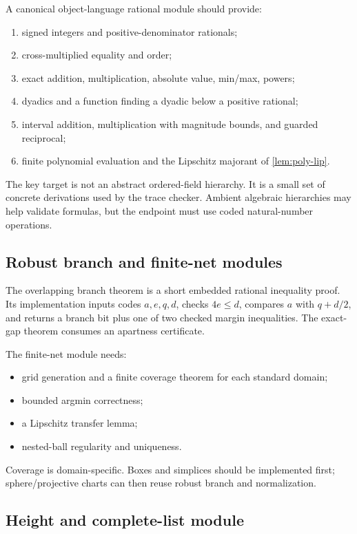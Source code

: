 A canonical object-language rational module should provide:

\begin{enumerate}
\item signed integers and positive-denominator rationals;
\item cross-multiplied equality and order;
\item exact addition, multiplication, absolute value, min/max, powers;
\item dyadics and a function finding a dyadic below a positive rational;
\item interval addition, multiplication with magnitude bounds, and guarded
      reciprocal;
\item finite polynomial evaluation and the Lipschitz majorant of
      \cref{lem:poly-lip}.
\end{enumerate}

The key target is not an abstract ordered-field hierarchy.  It is a small set
of concrete derivations used by the trace checker.  Ambient algebraic
hierarchies may help validate formulas, but the endpoint must use coded
natural-number operations.

\subsection{Robust branch and finite-net modules}

The overlapping branch theorem is a short embedded rational inequality proof.
Its implementation inputs codes \(a,e,q,d\), checks \(4e\le d\), compares
\(a\) with \(q+d/2\), and returns a branch bit plus one of two checked margin
inequalities.  The exact-gap theorem consumes an apartness certificate.

The finite-net module needs:
\begin{itemize}
\item grid generation and a finite coverage theorem for each standard domain;
\item bounded argmin correctness;
\item a Lipschitz transfer lemma;
\item nested-ball regularity and uniqueness.
\end{itemize}
Coverage is domain-specific.  Boxes and simplices should be implemented first;
sphere/projective charts can then reuse robust branch and normalization.

\subsection{Height and complete-list module}

